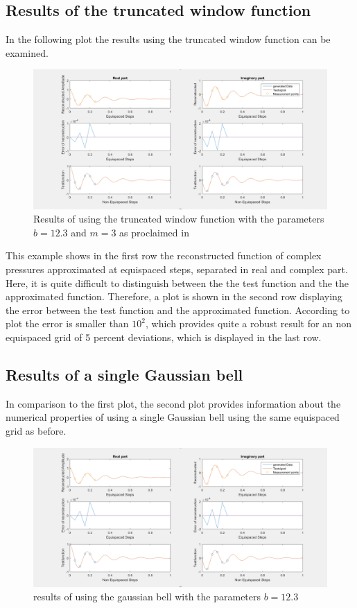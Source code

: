\documentclass[11pt]{report} %
\begin{document}
\subsection{Results of the truncated window function}
In the following plot the results using the truncated window function can be examined. 

\begin{figure}[H]
\centering
\includegraphics[scale=0.8]{./Figures/plot_trunc}
\caption{Results of using the truncated window function with the parameters $b=12.3$ and $m=3$ as proclaimed in }
\end{figure}

This example shows in the first row the reconstructed function of complex pressures approximated at equispaced steps, separated in real and complex part. 
Here, it is quite difficult to distinguish between the the test function and the the approximated function. 
Therefore, a plot is shown in the second row displaying the error between the test function and the approximated function. 
According to plot the error is smaller than $10^2$, which provides quite a robust result for an non equispaced grid of 5 percent deviations, which is displayed in the last row.


\subsection{Results of a single Gaussian bell}
In comparison to the first plot, the second plot provides information about the numerical properties of using a single Gaussian bell using the same equispaced grid as before.

\begin{figure}[H]
\centering
\includegraphics[scale=0.8]{./Figures/plot_trunc}
\caption{results of using the gaussian bell with the parameters $b=12.3$}
\end{figure}
\end{document}

